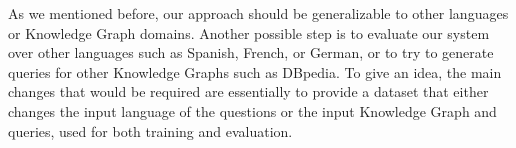 As we mentioned before, our approach should be generalizable to other languages or Knowledge Graph 
domains. Another possible step is to evaluate our system over other languages such as Spanish, 
French, or German, or to try to generate \SPARQL{} queries for other Knowledge Graphs such as DBpedia. 
To give an idea, the main changes that would be required are essentially to provide a dataset that either 
changes the input language of the questions or the input Knowledge Graph and \SPARQL{} queries, used 
for both training and evaluation.
